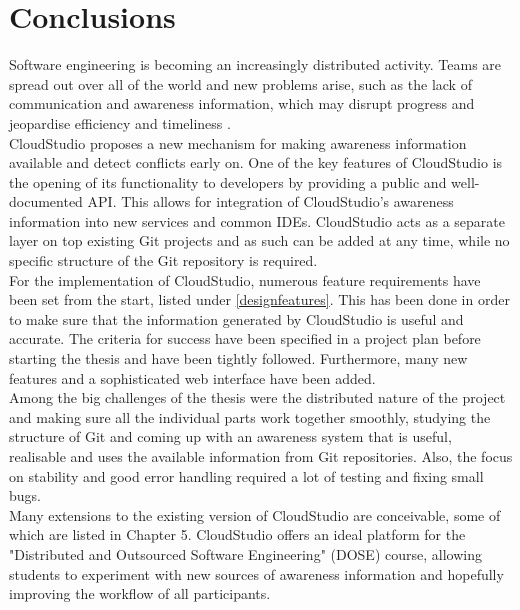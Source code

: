 

\chapter{Conclusions}\label{conclusions}






Software engineering is becoming an increasingly distributed activity. Teams are spread out over all of the world and new problems arise, such as the lack of communication and awareness information, which may disrupt progress and jeopardise efficiency and timeliness \cite{ref3}. \\

CloudStudio proposes a new mechanism for making awareness information available and detect conflicts early on. One of the key features of CloudStudio is the opening of its functionality to developers by providing a public and well-documented API. This allows for integration of CloudStudio's awareness information into new services and common IDEs. CloudStudio acts as a separate layer on top existing Git projects and as such can be added at any time, while no specific structure of the Git repository is required. \\

For the implementation of CloudStudio, numerous feature requirements have been set from the start, listed under \ref{designfeatures}. This has been done in order to make sure that the information generated by CloudStudio is useful and accurate. The criteria for success have been specified in a project plan before starting the thesis and have been tightly followed. Furthermore, many new features and a sophisticated web interface have been added. \\

Among the big challenges of the thesis were the distributed nature of the project and making sure all the individual parts work together smoothly, studying the structure of Git and coming up with an awareness system that is useful, realisable and uses the available information from Git repositories. Also, the focus on stability and good error handling required a lot of testing and fixing small bugs. \\

Many extensions to the existing version of CloudStudio are conceivable, some of which are listed in Chapter 5. CloudStudio offers an ideal platform for the "Distributed and Outsourced Software Engineering" (DOSE) course, allowing students to experiment with new sources of awareness information and hopefully improving the workflow of all participants.



